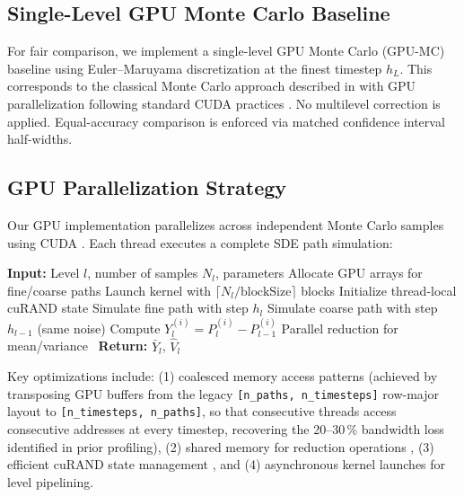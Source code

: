 \documentclass[pdflatex,sn-mathphys-num]{sn-jnl}
\theoremstyle{thmstyleone}%
\theoremstyle{thmstyletwo}%
\theoremstyle{thmstylethree}%
\begin{document}
\subsection{Single-Level GPU Monte Carlo Baseline}

For fair comparison, we implement a single-level GPU Monte Carlo (GPU-MC) baseline using
Euler--Maruyama discretization at the finest timestep $h_L$. This corresponds to the classical
Monte Carlo approach described in \cite{glasserman2003monte} with GPU parallelization following
standard CUDA practices \cite{nvidia2020cuda,owens2008,harris2007}. No multilevel correction
is applied. Equal-accuracy comparison is enforced via matched confidence interval half-widths.

\subsection{GPU Parallelization Strategy}

Our GPU implementation parallelizes across independent Monte Carlo samples using CUDA
\cite{nvidia2020cuda}. Each thread executes a complete SDE path simulation:

\begin{algorithm}
\caption{GPU Parallel MLMC Sampling (PyTorch CUDA tensors on A100; PyCUDA
\texttt{SourceModule} variant for compatible drivers)}
\label{alg:gpu}
\begin{algorithmic}[1]
\STATE \textbf{Input:} Level $l$, number of samples $N_l$, parameters
\STATE Allocate GPU arrays for fine/coarse paths
\STATE Launch kernel with $\lceil N_l / \text{blockSize} \rceil$ blocks
    \STATE Initialize thread-local cuRAND state
    \STATE Simulate fine path with step $h_l$
    \STATE Simulate coarse path with step $h_{l-1}$ (same noise)
    \STATE Compute $Y_l^{(i)} = P_l^{(i)} - P_{l-1}^{(i)}$
\ENDFOR
\STATE Parallel reduction for mean/variance~\cite{harris2007}
\STATE \textbf{Return:} $\bar{Y}_l$, $\hat{V}_l$
\end{algorithmic}
\end{algorithm}

Key optimizations include: (1) coalesced memory access patterns
   (achieved by transposing GPU buffers from the legacy
   \texttt{[n\_paths, n\_timesteps]} row-major layout to
   \texttt{[n\_timesteps, n\_paths]}, so that consecutive threads access
   consecutive addresses at every timestep, recovering the 20--30\,\%
   bandwidth loss identified in prior profiling), (2) shared memory for
reduction operations \cite{harris2007}, (3) efficient cuRAND state management \cite{nvidia2020cuda},
and (4) asynchronous kernel launches for level pipelining.
\end{document}
